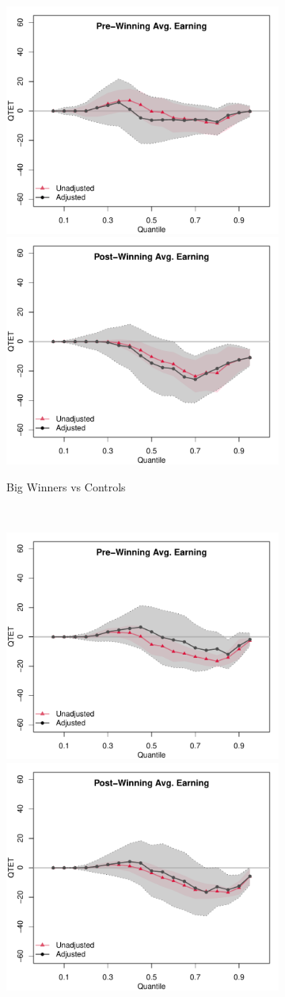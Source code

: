 \documentclass[letterpaper,12pt,leqno]{article}
\begin{document}
\begin{figure}[!ht]
    \caption{Quantile Treatment Effects: IRS Data  (Trimmed Sample)}\label{fig:qte.irs2}
    \begin{minipage}[c]{1\textwidth}
        \hspace{-2em}\centering
        \begin{subfigure}{1\linewidth}
            \includegraphics[width=0.45\linewidth]{irs1_qte_pre_trim.pdf}\hspace{1em}
            \includegraphics[width=0.45\linewidth]{irs1_qte_pst_trim.pdf}
            \caption{Big Winners vs Controls}
        \end{subfigure}\\
        \begin{subfigure}{1\linewidth}
            \includegraphics[width=0.45\linewidth]{irs2_qte_pre_trim.pdf}\hspace{1em}
            \includegraphics[width=0.45\linewidth]{irs2_qte_pst_trim.pdf}

\end{subfigure}
\end{minipage}
\end{figure}
\end{document}
